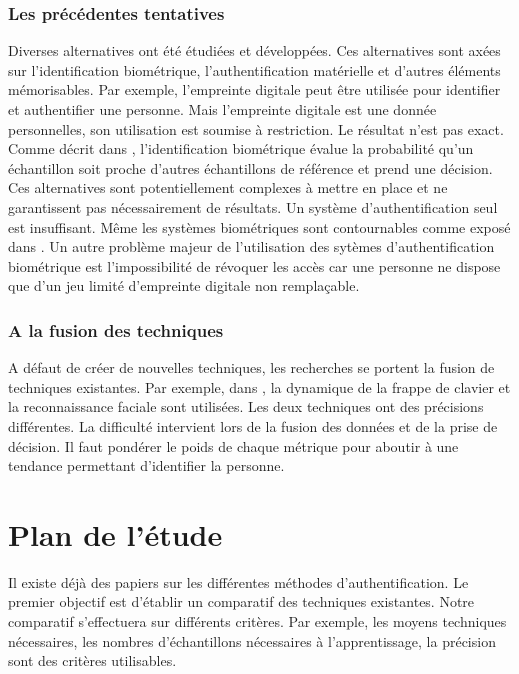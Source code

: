 \documentclass[conference,compsoc]{IEEEtran}
\begin{document}
\subsubsection{Les précédentes tentatives}

Diverses alternatives ont été étudiées et développées. Ces alternatives sont axées sur l'identification biométrique, l'authentification matérielle et d'autres éléments mémorisables. Par exemple, l'empreinte digitale peut être utilisée pour identifier et authentifier une personne. Mais l'empreinte digitale est une donnée personnelles, son utilisation est soumise à restriction. Le résultat n'est pas exact. Comme décrit dans \cite{10.1109/MC.2012.364} , l'identification biométrique évalue la probabilité qu'un échantillon soit proche d'autres échantillons de référence et prend une décision. Ces alternatives sont potentiellement complexes à mettre en place et ne garantissent pas nécessairement de résultats. Un système d'authentification seul est insuffisant. Même les systèmes biométriques sont contournables comme exposé dans \cite{duc2009your}. Un autre problème majeur de l'utilisation des sytèmes d'authentification biométrique est l'impossibilité de révoquer les accès car une personne ne dispose que d'un jeu limité d'empreinte digitale non remplaçable.

\subsubsection{A la fusion des techniques}

A défaut de créer de nouvelles techniques, les recherches se portent la fusion de techniques existantes. Par exemple, dans \cite{7371386}, la dynamique de la frappe de clavier et la reconnaissance faciale sont utilisées. Les deux techniques ont des précisions différentes. La difficulté intervient lors de la fusion des données et de la prise de décision. Il faut pondérer le poids de chaque métrique pour aboutir à une tendance permettant d'identifier la personne.

\section{Plan de l'étude}

Il existe déjà des papiers sur les différentes méthodes d'authentification.
Le premier objectif est d'établir un comparatif des techniques existantes. Notre comparatif s'effectuera sur différents critères. Par exemple, les moyens techniques nécessaires, les nombres d'échantillons nécessaires à l'apprentissage, la précision sont des critères utilisables.
\end{document}
